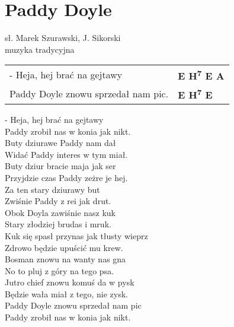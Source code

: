 \section{Paddy Doyle}

sł. Marek Szurawski, J. Sikorski\\
muzyka tradycyjna

\vspace{1em}
\begin{tabular}{@{}p{7cm}@{}l@{}}
- Heja, hej brać na gejtawy & \bfseries E H\textsuperscript{7} E A\\
Paddy Doyle znowu sprzedał nam pic. & \bfseries E H\textsuperscript{7} E\\
\end{tabular}

\vspace{1em}
- Heja, hej brać na gejtawy \\
Paddy zrobił nas w konia jak nikt. \\

Buty dziurawe Paddy nam dał \\
Widać Paddy interes w tym miał. \\

Buty dziur bracie maja jak ser \\
Przyjdzie czas Paddy zeżre je hej. \\

Za ten stary dziurawy but \\
Zwiśnie Paddy z rei jak drut. \\

Obok Doyla zawiśnie nasz kuk \\
Stary złodziej brudas i mruk. \\

Kuk się spasł przynas jak tłusty wieprz \\
Zdrowo będzie upuścić mu krew. \\

Bosman znowu na wanty nas gna \\
No to pluj z góry na tego psa. \\

Jutro chief znowu komuś da w pysk \\
Będzie wała miał z tego, nie zysk. \\

Paddy Doyle znowu sprzedał nam pic \\
Paddy zrobił nas w konia jak nikt. \\